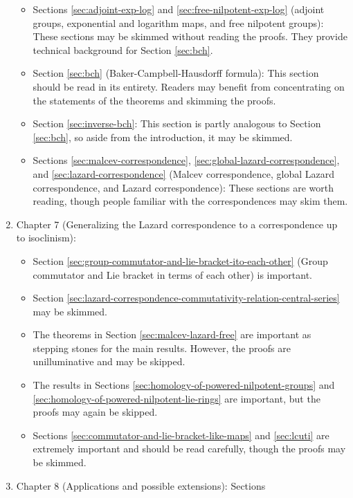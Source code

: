 \begin{enumerate}
  \begin{itemize}
  \item Sections \ref{sec:adjoint-exp-log} and
    \ref{sec:free-nilpotent-exp-log} (adjoint groups, exponential and
    logarithm maps, and free nilpotent groups): These sections may be
    skimmed without reading the proofs. They provide technical
    background for Section \ref{sec:bch}.
  \item Section \ref{sec:bch} (Baker-Campbell-Hausdorff formula): This
    section should be read in its entirety. Readers may benefit from
    concentrating on the statements of the theorems and skimming the
    proofs.
  \item Section \ref{sec:inverse-bch}: This section is partly analogous
    to Section \ref{sec:bch}, so aside from the introduction, it may be
    skimmed.
  \item Sections \ref{sec:malcev-correspondence},
    \ref{sec:global-lazard-correspondence}, and
  \ref{sec:lazard-correspondence} (Malcev correspondence, global
  Lazard correspondence, and Lazard correspondence): These sections
  are worth reading, though people familiar with the correspondences
  may skim them.
  \end{itemize}
\item Chapter 7 (Generalizing the Lazard correspondence to a
  correspondence up to isoclinism):
  \begin{itemize}
  \item Section
    \ref{sec:group-commutator-and-lie-bracket-ito-each-other} (Group
    commutator and Lie bracket in terms of each other) is important.
  \item Section
    \ref{sec:lazard-correspondence-commutativity-relation-central-series}
    may be skimmed.
  \item The theorems in Section \ref{sec:malcev-lazard-free} are
    important as stepping stones for the main results. However, the
    proofs are unilluminative and may be skipped.
  \item The results in Sections
    \ref{sec:homology-of-powered-nilpotent-groups} and
    \ref{sec:homology-of-powered-nilpotent-lie-rings} are important, but
    the proofs may again be skipped.
  \item Sections \ref{sec:commutator-and-lie-bracket-like-maps} and
    \ref{sec:lcuti} are extremely important and should be read
    carefully, though the proofs may be skimmed.
  \end{itemize}
\item Chapter 8 (Applications and possible extensions): Sections

\end{enumerate}
